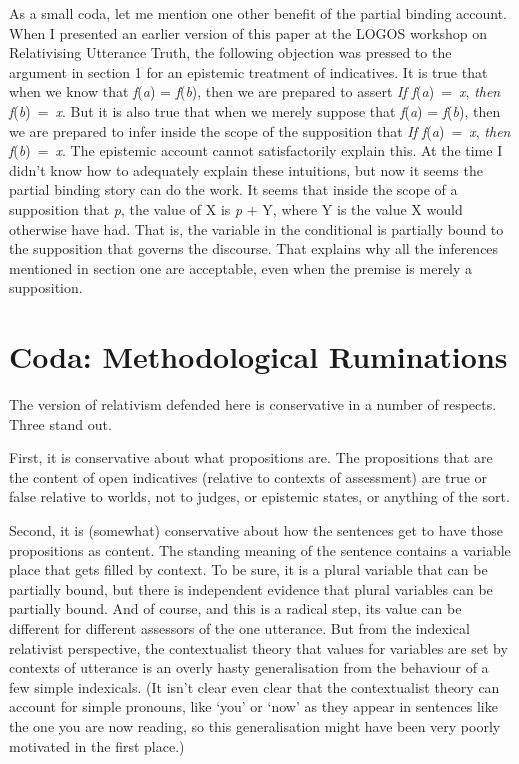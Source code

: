 \documentclass[
  11pt,
  letterpaper,
  DIV=11,
  numbers=noendperiod,
  oneside]{scrartcl}
\begin{document}
As a small coda, let me mention one other benefit of the partial binding
account. When I presented an earlier version of this paper at the LOGOS
workshop on Relativising Utterance Truth, the following objection was
pressed to the argument in section 1 for an epistemic treatment of
indicatives. It is true that when we know that \emph{f}(\emph{a}) =
\emph{f}(\emph{b}), then we are prepared to assert \emph{If
f}(\emph{a})~=~\emph{x}, \emph{then f}(\emph{b})~=~\emph{x}. But it is
also true that when we merely suppose that \emph{f}(\emph{a}) =
\emph{f}(\emph{b}), then we are prepared to infer inside the scope of
the supposition that \emph{If f}(\emph{a})~=~\emph{x}, \emph{then
f}(\emph{b})~=~\emph{x}. The epistemic account cannot satisfactorily
explain this. At the time I didn't know how to adequately explain these
intuitions, but now it seems the partial binding story can do the work.
It seems that inside the scope of a supposition that \emph{p}, the value
of X is \emph{p} + Y, where Y is the value X would otherwise have had.
That is, the variable in the conditional is partially bound to the
supposition that governs the discourse. That explains why all the
inferences mentioned in section one are acceptable, even when the
premise is merely a supposition.

\section*{Coda: Methodological
Ruminations}\label{coda-methodological-ruminations}

The version of relativism defended here is conservative in a number of
respects. Three stand out.

First, it is conservative about what propositions are. The propositions
that are the content of open indicatives (relative to contexts of
assessment) are true or false relative to worlds, not to judges, or
epistemic states, or anything of the sort.

Second, it is (somewhat) conservative about how the sentences get to
have those propositions as content. The standing meaning of the sentence
contains a variable place that gets filled by context. To be sure, it is
a plural variable that can be partially bound, but there is independent
evidence that plural variables can be partially bound. And of course,
and this is a radical step, its value can be different for different
assessors of the one utterance. But from the indexical relativist
perspective, the contextualist theory that values for variables are set
by contexts of utterance is an overly hasty generalisation from the
behaviour of a few simple indexicals. (It isn't clear even clear that
the contextualist theory can account for simple pronouns, like `you' or
`now' as they appear in sentences like the one you are now reading, so
this generalisation might have been very poorly motivated in the first
place.)
\end{document}
